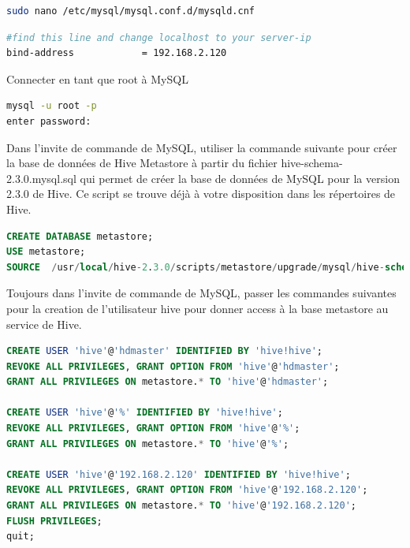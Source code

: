 \documentclass[12pt,english]{book}
\begin{document}
\begin{lstlisting}[language=bash, frame=single]
sudo nano /etc/mysql/mysql.conf.d/mysqld.cnf 
\end{lstlisting}

\begin{lstlisting}[language=bash, frame=single]
#find this line and change localhost to your server-ip
bind-address            = 192.168.2.120
\end{lstlisting}

Connecter en tant que root à MySQL

\begin{lstlisting}[language=bash, frame=single]
mysql -u root -p
enter password:
\end{lstlisting}

Dans l’invite de commande de MySQL, utiliser la commande suivante pour créer la base de données de Hive Metastore à partir du fichier hive-schema-2.3.0.mysql.sql qui permet de créer la base de données de MySQL pour la version 2.3.0 de Hive.
Ce script se trouve déjà à votre disposition dans les répertoires de Hive.

\begin{lstlisting}[language=SQL, frame=single, breaklines=true, postbreak=\mbox{\textcolor{red}{$\hookrightarrow$}\space}]
CREATE DATABASE metastore;
USE metastore;
SOURCE  /usr/local/hive-2.3.0/scripts/metastore/upgrade/mysql/hive-schema-2.3.0.mysql.sql
\end{lstlisting}

Toujours dans l’invite de commande de MySQL, passer les commandes suivantes pour la creation de l’utilisateur hive pour donner access à la base metastore au service de Hive. 

\begin{lstlisting}[language=SQL, frame=single, breaklines=true, postbreak=\mbox{\textcolor{red}{$\hookrightarrow$}\space}]
CREATE USER 'hive'@'hdmaster' IDENTIFIED BY 'hive!hive';
REVOKE ALL PRIVILEGES, GRANT OPTION FROM 'hive'@'hdmaster';
GRANT ALL PRIVILEGES ON metastore.* TO 'hive'@'hdmaster';

CREATE USER 'hive'@'%' IDENTIFIED BY 'hive!hive';
REVOKE ALL PRIVILEGES, GRANT OPTION FROM 'hive'@'%';
GRANT ALL PRIVILEGES ON metastore.* TO 'hive'@'%';

CREATE USER 'hive'@'192.168.2.120' IDENTIFIED BY 'hive!hive';
REVOKE ALL PRIVILEGES, GRANT OPTION FROM 'hive'@'192.168.2.120';
GRANT ALL PRIVILEGES ON metastore.* TO 'hive'@'192.168.2.120';
FLUSH PRIVILEGES;
quit;
\end{lstlisting}
\end{document}
